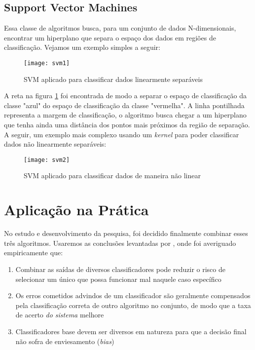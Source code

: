 \subsection{Support Vector Machines}

Essa classe de algoritmos busca, para um conjunto de dados N-dimensionais, encontrar um hiperplano que separa o espaço dos dados em regiões de classificação. Vejamos um exemplo simples a seguir:


\begin{figure}[H]
	\centering
	\caption{SVM aplicado para classificar dados linearmente separáveis}
  \texttt{[image: svm1]}
\label{fig:svm1}  

\end{figure}



A reta na figura \ref{fig:svm1} foi encontrada de modo a separar o espaço de classificação da classe "azul" do espaço de classificação da classe "vermelha". A linha pontilhada representa a margem de classificação, o algoritmo busca chegar a um hiperplano que tenha ainda uma distância dos pontos mais próximos da região de separação. A seguir, um exemplo mais complexo usando um \textit{kernel}  para poder classificar dados não linearmente separáveis:

\begin{figure}[H]
	\centering
	\caption{SVM aplicado para classificar dados de maneira não linear}
  \texttt{[image: svm2]}
\label{fig:svm2}  

\end{figure}

\section{Aplicação na Prática}

No estudo e desenvolvimento da pesquisa, foi decidido finalmente combinar esses três algoritmos. Usaremos as conclusões levantadas por \cite{comparativeEN}, onde foi averiguado empiricamente que: 

\begin{enumerate}
\item Combinar as saídas de diversos classificadores pode reduzir o risco de selecionar um único que possa funcionar mal naquele caso específico
\item Os erros cometidos advindos de um classificador são geralmente compensados pela classificação correta de outro algoritmo no conjunto, de modo que a taxa de acerto \textit{do sistema} melhore
\item Classificadores base devem ser diversos em natureza para que a decisão final não sofra de enviesamento (\textit{bias})
\end{enumerate}



